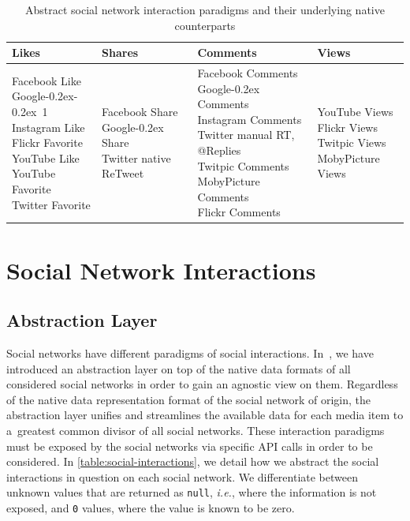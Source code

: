 \documentclass{sig-alternate}
\DeclareRobustCommand{\googleplus}{\mbox{Google\hspace{0em}\raisebox{.28ex}{\tiny\bf +}\kern-0.2ex}\xspace}
\DeclareRobustCommand{\plusone}{\mbox{\hspace{0em}\raisebox{.28ex}{\tiny\bf +}\kern-0.2ex 1}\xspace}
\begin{document}
\begin{table}[t!]
  \centering
  \begin{tabular}{|l|l|l|l|}
    \hline
    Likes & Shares & Comments & Views\\ \hline
    \pbox[t][2.5cm]{0.5\columnwidth}{Facebook Like\\ \googleplus \plusone\\ Instagram Like\\ Flickr Favorite\\ YouTube Like\\ YouTube Favorite\\ Twitter Favorite} & \pbox[t][2.5cm]{0.5\columnwidth}{Facebook Share\\ \googleplus Share\\ Twitter native ReTweet} & \pbox[t][2.5cm]{0.5\columnwidth}{Facebook Comments\\ \googleplus Comments\\ Instagram Comments\\ Twitter manual RT, @Replies\\ Twitpic Comments\\ MobyPicture Comments\\ Flickr Comments} & \pbox[t][2.5cm]{0.5\columnwidth}{YouTube Views\\ Flickr Views\\ Twitpic Views\\ MobyPicture Views}\\
      \hline
    \end{tabular}
    \caption{Abstract social network interaction paradigms
      and their underlying native counterparts}
  \label{table:social-interactions}
\end{table}

\section{Social Network Interactions}

\subsection{Abstraction Layer}
\label{sec:social-network-interactions}

Social networks have different paradigms of social interactions.
In~\cite{rizzo2012whatfresh}, we have introduced an
abstraction layer on top of the native data formats
of all considered social networks in order to gain
an agnostic view on them.
Regardless of the native data representation format
of the social network of origin, the abstraction layer unifies and streamlines
the available data for each media item
to a~greatest common divisor of all social networks.
These interaction paradigms must be exposed by the social networks 
via specific API calls in order to be considered.
In \autoref{table:social-interactions}, we detail
how we abstract the social interactions in question on each social network.
We differentiate between unknown values
that are returned as \texttt{null}, \emph{i.e.},
where the information is not exposed,
and \texttt{0} values, where the value is known to be zero.
\end{document}
